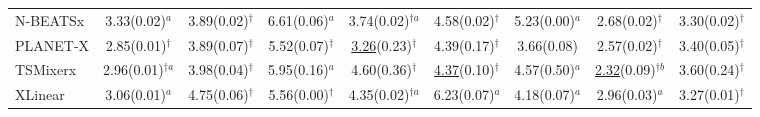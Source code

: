\begin{table}[!t]
\begin{adjustbox}{max width=\linewidth}
\begin{tabular}{lcccccccc}
N-BEATSx & 3.33{\scriptsize\color{gray}(0.02)}$^{a}$ & 3.89{\scriptsize\color{gray}(0.02)}$^{\dagger{}}$ & 6.61{\scriptsize\color{gray}(0.06)}$^{a}$ & 3.74{\scriptsize\color{gray}(0.02)}$^{\dagger{}a}$ & 4.58{\scriptsize\color{gray}(0.02)}$^{\dagger{}}$ & 5.23{\scriptsize\color{gray}(0.00)}$^{a}$ & 2.68{\scriptsize\color{gray}(0.02)}$^{\dagger{}}$ & 3.30{\scriptsize\color{gray}(0.02)}$^{\dagger{}}$ \\
PLANET-X & 2.85{\scriptsize\color{gray}(0.01)}$^{\dagger{}}$ & 3.89{\scriptsize\color{gray}(0.07)}$^{\dagger{}}$ & 5.52{\scriptsize\color{gray}(0.07)}$^{\dagger{}}$ & \underline{3.26}{\scriptsize\color{gray}(0.23)}$^{\dagger{}}$ & 4.39{\scriptsize\color{gray}(0.17)}$^{\dagger{}}$ & 3.66{\scriptsize\color{gray}(0.08)} & 2.57{\scriptsize\color{gray}(0.02)}$^{\dagger{}}$ & 3.40{\scriptsize\color{gray}(0.05)}$^{\dagger{}}$ \\
TSMixerx & 2.96{\scriptsize\color{gray}(0.01)}$^{\dagger{}a}$ & 3.98{\scriptsize\color{gray}(0.04)}$^{\dagger{}}$ & 5.95{\scriptsize\color{gray}(0.16)}$^{a}$ & 4.60{\scriptsize\color{gray}(0.36)}$^{\dagger{}}$ & \underline{4.37}{\scriptsize\color{gray}(0.10)}$^{\dagger{}}$ & 4.57{\scriptsize\color{gray}(0.50)}$^{a}$ & \underline{2.32}{\scriptsize\color{gray}(0.09)}$^{\dagger{}b}$ & 3.60{\scriptsize\color{gray}(0.24)}$^{\dagger{}}$ \\
XLinear & 3.06{\scriptsize\color{gray}(0.01)}$^{a}$ & 4.75{\scriptsize\color{gray}(0.06)}$^{\dagger{}}$ & 5.56{\scriptsize\color{gray}(0.00)}$^{\dagger{}}$ & 4.35{\scriptsize\color{gray}(0.02)}$^{\dagger{}a}$ & 6.23{\scriptsize\color{gray}(0.07)}$^{a}$ & 4.18{\scriptsize\color{gray}(0.07)}$^{a}$ & 2.96{\scriptsize\color{gray}(0.03)}$^{a}$ & 3.27{\scriptsize\color{gray}(0.01)}$^{\dagger{}}$ \\
\bottomrule
\end{tabular}
\end{adjustbox}
\end{table}
